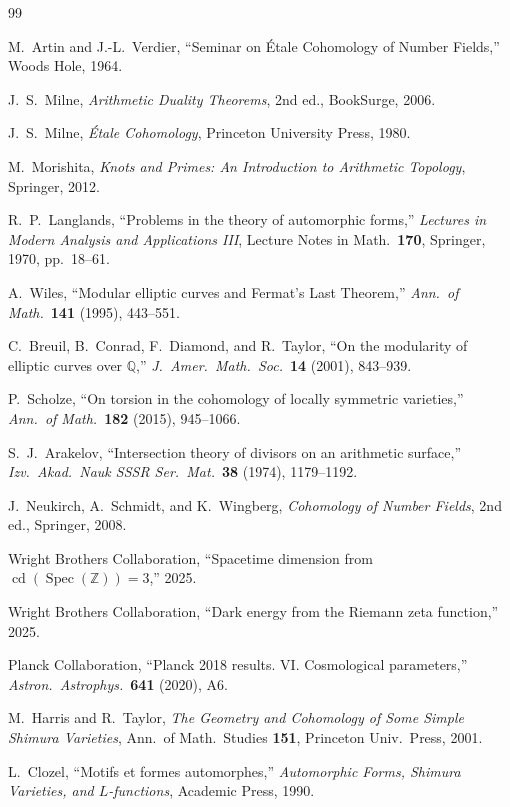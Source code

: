 \documentclass[12pt,a4paper]{article}
\theoremstyle{definition}
\newcommand{\Spec}{\operatorname{Spec}}
\newcommand{\cd}{\operatorname{cd}}
\newcommand{\Q}{\mathbb{Q}}
\newcommand{\Z}{\mathbb{Z}}
\begin{document}
\begin{thebibliography}{99}

M.~Artin and J.-L.~Verdier,
``Seminar on \'Etale Cohomology of Number Fields,''
Woods Hole, 1964.

J.~S.~Milne,
\textit{Arithmetic Duality Theorems}, 2nd ed.,
BookSurge, 2006.

J.~S.~Milne,
\textit{\'Etale Cohomology},
Princeton University Press, 1980.

M.~Morishita,
\textit{Knots and Primes: An Introduction to Arithmetic Topology},
Springer, 2012.

R.~P.~Langlands,
``Problems in the theory of automorphic forms,''
\textit{Lectures in Modern Analysis and Applications III},
Lecture Notes in Math.\ \textbf{170}, Springer, 1970, pp.~18--61.

A.~Wiles,
``Modular elliptic curves and Fermat's Last Theorem,''
\textit{Ann.\ of Math.}\ \textbf{141} (1995), 443--551.

C.~Breuil, B.~Conrad, F.~Diamond, and R.~Taylor,
``On the modularity of elliptic curves over $\Q$,''
\textit{J.\ Amer.\ Math.\ Soc.}\ \textbf{14} (2001), 843--939.

P.~Scholze,
``On torsion in the cohomology of locally symmetric varieties,''
\textit{Ann.\ of Math.}\ \textbf{182} (2015), 945--1066.

S.~J.~Arakelov,
``Intersection theory of divisors on an arithmetic surface,''
\textit{Izv.\ Akad.\ Nauk SSSR Ser.\ Mat.}\ \textbf{38} (1974), 1179--1192.

J.~Neukirch, A.~Schmidt, and K.~Wingberg,
\textit{Cohomology of Number Fields}, 2nd ed.,
Springer, 2008.

Wright Brothers Collaboration,
``Spacetime dimension from $\cd(\Spec(\Z))=3$,''
2025.

Wright Brothers Collaboration,
``Dark energy from the Riemann zeta function,''
2025.

Planck Collaboration,
``Planck 2018 results. VI. Cosmological parameters,''
\textit{Astron.\ Astrophys.}\ \textbf{641} (2020), A6.

M.~Harris and R.~Taylor,
\textit{The Geometry and Cohomology of Some Simple Shimura Varieties},
Ann.\ of Math.\ Studies \textbf{151}, Princeton Univ.\ Press, 2001.

L.~Clozel,
``Motifs et formes automorphes,''
\textit{Automorphic Forms, Shimura Varieties, and $L$-functions},
Academic Press, 1990.

\end{thebibliography}
\end{document}
